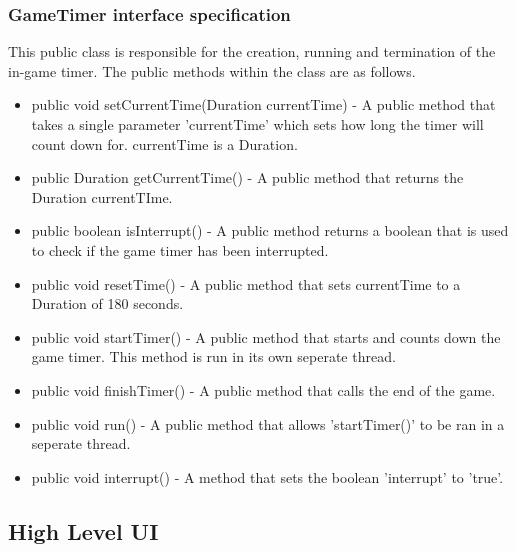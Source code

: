        \subsubsection{GameTimer interface specification} %
        This public class is responsible for the creation, running and termination of the in-game timer. The public methods within the class are as follows.
        \begin{itemize}
       		    \item public void setCurrentTime(Duration currentTime) - A public method that takes a single parameter 'currentTime'  which sets how long the timer will count down for.  currentTime is a Duration.
      		    \item public Duration getCurrentTime() - A public method that returns the Duration currentTIme.
     		    \item public boolean isInterrupt() - A public method returns a boolean that is used to check if the game timer has been interrupted.
   			    \item public void resetTime() - A public method that sets currentTime to a Duration of 180 seconds.
                \item public void startTimer() - A public method that starts and counts down the game timer. This method is run in its own seperate thread.
  				\item public void finishTimer() - A public method that calls the end of the game.
 				\item public void run() - A public method that allows 'startTimer()' to be ran in a seperate thread.
 				\item public void interrupt() - A method that sets the boolean 'interrupt' to 'true'.
 \end{itemize}
    \subsection{High Level UI}
